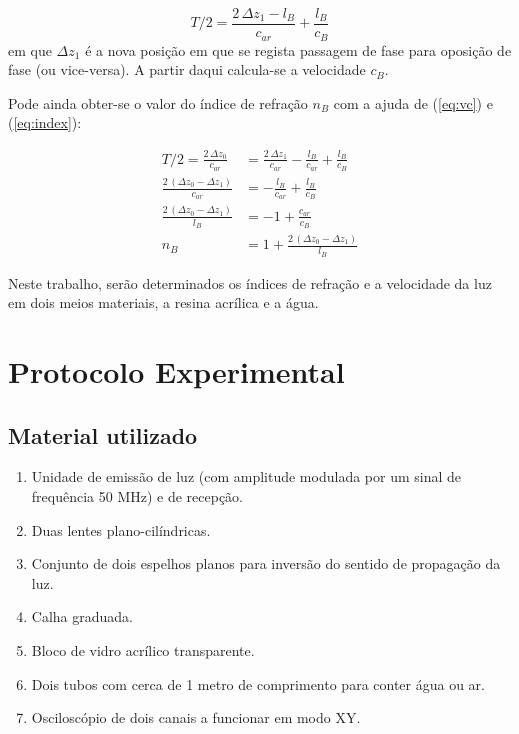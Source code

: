 \documentclass[a4paper,12pt]{article}      %
\begin{document}
\begin{equation}
	\label{eq:vc_bloco}
	{T/2}  = \frac{2\,\Delta z_1 - l_B}{c_{ar}}  +  \frac{l_B}{c_{B}}
\end{equation}
em que $\Delta z_1$ é a nova posição em que se regista passagem de fase para oposição de fase (ou vice-versa). A partir daqui calcula-se a velocidade $c_{B}$.  

Pode ainda obter-se o valor do índice de refração $n_{B}$ com a ajuda de (\ref{eq:vc}) e (\ref{eq:index}):

\begin{align}
	\label{eq:n_bloco}
	{T/2}  = \frac{2\,\Delta z_0}{c_{ar}}  &=  \frac{2\,\Delta z_1 }{c_{ar}} -   \frac{l_B}{c_{ar}}  +  \frac{l_B}{c_{B}} \nonumber \\ 
	\frac{2\,(\Delta z_0- \Delta z_1 )}{c_{ar}}  &= -   \frac{l_B}{c_{ar}}  +  \frac{l_B}{c_{B}} \nonumber \\
	\frac{2\,(\Delta z_0- \Delta z_1 )}{l_B} &= -1 +  \frac{c_{ar}}{c_{B}} \nonumber \\
	n_{B} &= 1 +  \frac{2\,(\Delta z_0- \Delta z_1 )}{l_B} 
\end{align}

Neste trabalho, serão  determinados os índices de refração e a velocidade da luz em  dois meios materiais, a resina acrílica e a água. 
 


\newpage
\section{\sf Protocolo Experimental}
\subsection{\sf Material utilizado}

\begin{enumerate}
\setlength{\itemsep}{0mm}
\item Unidade de emissão de luz  (com amplitude modulada por um sinal de frequência 50 MHz) e de recepção.
\item Duas lentes plano-cilíndricas.
\item Conjunto de dois espelhos planos para inversão do sentido de propagação da luz.
\item Calha graduada.  
\item Bloco de vidro acrílico transparente.
\item Dois tubos com cerca de 1 metro de comprimento para conter água ou ar. 
\item Osciloscópio de dois canais a funcionar em modo XY.
\end{enumerate}
\end{document}
